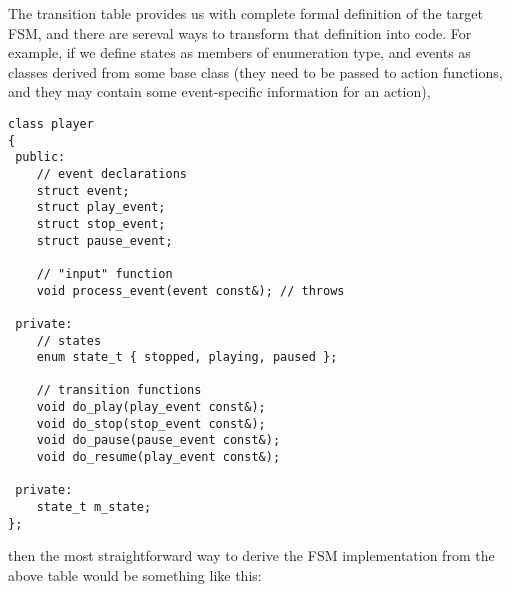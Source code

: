 \documentclass{netobjectdays}
\begin{document}

The transition table provides us with complete formal 
definition of the target FSM, and there are sereval ways to 
transform that definition into code. For example, if we define
states as members of enumeration type, and events as classes 
derived from some base 
class (they need to be passed to action functions, and they may
contain some event-specific information for an action), 

{\footnotesize
\begin{verbatim}
class player
{
 public:
    // event declarations
    struct event;
    struct play_event;
    struct stop_event;
    struct pause_event;

    // "input" function
    void process_event(event const&); // throws

 private:
    // states
    enum state_t { stopped, playing, paused };

    // transition functions
    void do_play(play_event const&);
    void do_stop(stop_event const&);
    void do_pause(pause_event const&);
    void do_resume(play_event const&);

 private:
    state_t m_state;
};
\end{verbatim}
}


then the most straightforward way to derive the FSM 
implementation from the above table would be something 
like this:
\end{document}
